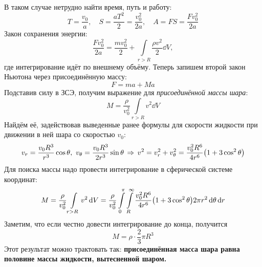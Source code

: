 В таком случае нетрудно найти время, путь и работу:
\begin{equation}
    T=\frac{v_0}{a}, \quad S = \frac{aT^2}{2} = \frac{v_0^2}{2a}, \quad
    A = FS = \frac{Fv_0^2}{2a}
\end{equation}
Закон сохранения энергии:
\begin{equation}
    \frac{Fv_0^2}{2a} = \frac{mv_0^2}{2} + \int\limits_{r>R} \frac{\rho v^2}{2} \dd{V},
\end{equation}
где интегрирование идёт по внешнему объёму. Теперь запишем второй закон Ньютона через присоединённую массу: 
\begin{equation}
    F= ma +Ma
\end{equation}
Подставив силу в ЗСЭ,  получим выражение для \textit{присоединённой массы шара}:
\begin{equation}
    M  = \frac{\rho}{v_0^2} \int\limits_{r>R} v^2 \dd{V}
\end{equation}
Найдём её, задействовав выведенные ранее формулы для скорости жидкости при движении в ней шара со скоростью $v_0$:
\begin{equation}
    v_r= \frac{v_0 R^3}{r^3}\cos\theta, \,\,
    v_\theta = \frac{v_0 R^3}{2r^3} \sin\theta 
    \,\Rightarrow\, 
    v^2 = v_r^2 + v_\theta^2 = \frac{v_0^2 R^6}{4r^6}
        \qty(1+3\cos^2\theta)
\end{equation}
Для поиска массы надо провести интегрирование в сферической системе координат:
\begin{equation}
    M= \frac{\rho}{v_0^2} \int\limits_{r>R} v^2 \dd{V}=
    \frac{\rho}{v_0^2} \int\limits_0^\pi \int\limits_R^\infty  \frac{v_0^2 R^6}{4r^6}
        \qty(1+3\cos^2\theta)
 2\pi r^2 \dd{\theta} \dd{r}
\end{equation}
Заметим, что если честно довести интегрирование до конца, получится
\begin{equation}
    M = \rho \cdot \frac{2}{3} \pi R^3
\end{equation}
Этот результат можно трактовать так: \textbf{присоединённая масса шара равна половине массы жидкости, вытесненной шаром.}

